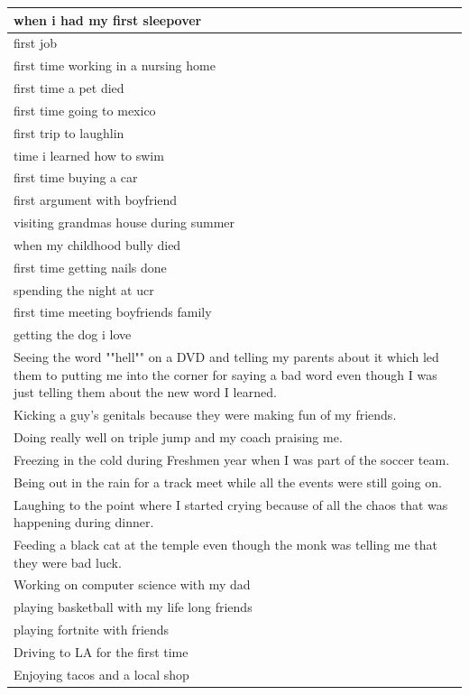 \documentclass[
  .7em,
  letterpaper,
  DIV=11,
  numbers=noendperiod]{scrartcl}
\begin{document}
\begin{table}
\begin{tabular}{l}
\hline
when i had my first sleepover\\
\hline
first job\\
\hline
first time working in a nursing home\\
\hline
first time a pet died\\
\hline
first time going to mexico\\
\hline
first trip to laughlin\\
\hline
time i learned how to swim\\
\hline
first time buying a car\\
\hline
first argument with boyfriend\\
\hline
visiting grandmas house during summer\\
\hline
when my childhood bully died\\
\hline
first time getting nails done\\
\hline
spending the night at ucr\\
\hline
first time meeting boyfriends family\\
\hline
getting the dog i love\\
\hline
Seeing the word ""hell"" on a DVD and telling my parents about it which led them to putting me into the corner for saying a bad word even though I was just telling them about the new word I learned.\\
\hline
Kicking a guy's genitals because they were making fun of my friends.\\
\hline
Doing really well on triple jump and my coach praising me.\\
\hline
Freezing in the cold during Freshmen year when I was part of the soccer team.\\
\hline
Being out in the rain for a track meet while all the events were still going on.\\
\hline
Laughing to the point where I started crying because of all the chaos that was happening during dinner.\\
\hline
Feeding a black cat at the temple even though the monk was telling me that they were bad luck.\\
\hline
Working on computer science with my dad\\
\hline
playing basketball with my life long friends\\
\hline
playing fortnite with friends\\
\hline
Driving to LA for the first time\\
\hline
Enjoying tacos and a local shop\\

\end{tabular}
\end{table}
\end{document}
